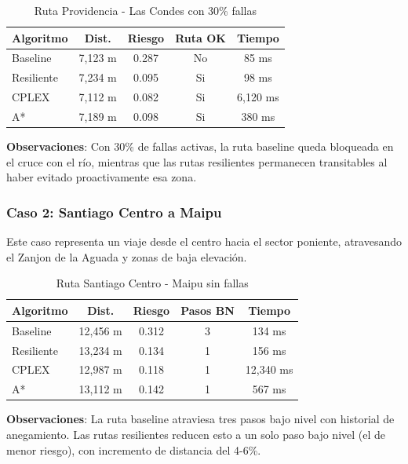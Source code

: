 \documentclass[conference]{IEEEtran}
\begin{document}
\begin{table}[!t]
\centering
\caption{Ruta Providencia - Las Condes con 30\% fallas}
\begin{tabular}{@{}lcccc@{}}
\toprule
\textbf{Algoritmo} & \textbf{Dist.} & \textbf{Riesgo} & \textbf{Ruta OK} & \textbf{Tiempo} \\
\midrule
Baseline & 7,123 m & 0.287 & No & 85 ms \\
Resiliente & 7,234 m & 0.095 & Si & 98 ms \\
CPLEX & 7,112 m & 0.082 & Si & 6,120 ms \\
A* & 7,189 m & 0.098 & Si & 380 ms \\
\bottomrule
\end{tabular}
\end{table}

\textbf{Observaciones}: Con 30\% de fallas activas, la ruta baseline queda bloqueada en el cruce con el río, mientras que las rutas resilientes permanecen transitables al haber evitado proactivamente esa zona.

\subsubsection{Caso 2: Santiago Centro a Maipu}

Este caso representa un viaje desde el centro hacia el sector poniente, atravesando el Zanjon de la Aguada y zonas de baja elevación.

\begin{table}[!t]
\centering
\caption{Ruta Santiago Centro - Maipu sin fallas}
\begin{tabular}{@{}lcccc@{}}
\toprule
\textbf{Algoritmo} & \textbf{Dist.} & \textbf{Riesgo} & \textbf{Pasos BN} & \textbf{Tiempo} \\
\midrule
Baseline & 12,456 m & 0.312 & 3 & 134 ms \\
Resiliente & 13,234 m & 0.134 & 1 & 156 ms \\
CPLEX & 12,987 m & 0.118 & 1 & 12,340 ms \\
A* & 13,112 m & 0.142 & 1 & 567 ms \\
\bottomrule
\end{tabular}
\end{table}

\textbf{Observaciones}: La ruta baseline atraviesa tres pasos bajo nivel con historial de anegamiento. Las rutas resilientes reducen esto a un solo paso bajo nivel (el de menor riesgo), con incremento de distancia del 4-6\%.
\end{document}
